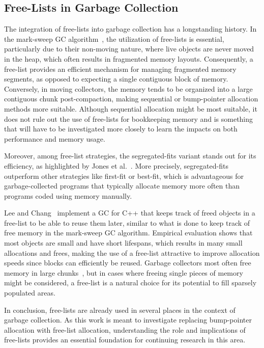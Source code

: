\subsection{Free-Lists in Garbage Collection}

The integration of free-lists into garbage collection has a longstanding history. In the mark-sweep GC algorithm~\cite{mark_sweep}, the utilization of free-lists is essential, particularly due to their non-moving nature, where live objects are never moved in the heap, which often results in fragmented memory layouts. Consequently, a free-list provides an efficient mechanism for managing fragmented memory segments, as opposed to expecting a single contiguous block of memory. Conversely, in moving collectors, the memory tends to be organized into a large contiguous chunk post-compaction, making sequential or bump-pointer allocation methods more suitable. Although sequential allocation might be most suitable, it does not rule out the use of free-lists for bookkeeping memory and is something that will have to be investigated more closely to learn the impacts on both performance and memory usage.

Moreover, among free-list strategies, the segregated-fits variant stands out for its efficiency, as highlighted by Jones et al.~\cite{gchandbook}. More precisely, segregated-fits outperform other strategies like first-fit or best-fit, which is advantageous for garbage-collected programs that typically allocate memory more often than programs coded using memory manually.

Lee and Chang~\cite{samsung_gc_free_list} implement a GC for C++ that keeps track of freed objects in a free-list to be able to reuse them later, similar to what is done to keep track of free memory in the mark-sweep GC algorithm. Empirical evaluation shows that most objects are small and have short lifespans, which results in many small allocations and frees, making the use of a free-list attractive to improve allocation speeds since blocks can efficiently be reused. Garbage collectors most often free memory in large chunks~\cite{gchandbook}, but in cases where freeing single pieces of memory might be considered, a free-list is a natural choice for its potential to fill sparsely populated areas.

In conclusion, free-lists are already used in several places in the context of garbage collection. As this work is meant to investigate replacing bump-pointer allocation with free-list allocation, understanding the role and implications of free-lists provides an essential foundation for continuing research in this area.

